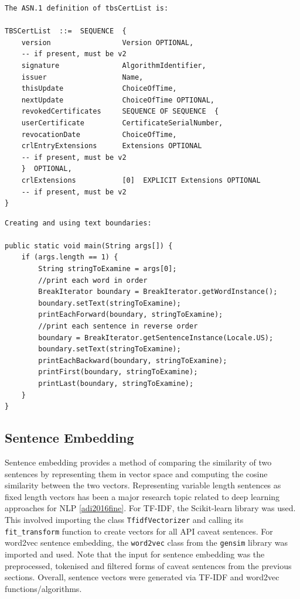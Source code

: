 \begin{lstlisting}[label=invalid-caveat-2,caption={An example of a caveat sentence extracted from the \lstinline{java.security.cert.X509CRL} documentation explaining the structure of a \lstinline{TBSCertList} object.},float,frame=tb,numbers=none,language=None,linebackgroundcolor={\lstcolorlines{3,4,5,6,7,8,9,10,11,12,13,14,15,16,17}}]
The ASN.1 definition of tbsCertList is:

TBSCertList  ::=  SEQUENCE  {
	version                 Version OPTIONAL,
	-- if present, must be v2
	signature               AlgorithmIdentifier,
	issuer                  Name,
	thisUpdate              ChoiceOfTime,
	nextUpdate              ChoiceOfTime OPTIONAL,
	revokedCertificates     SEQUENCE OF SEQUENCE  {
	userCertificate         CertificateSerialNumber,
	revocationDate          ChoiceOfTime,
	crlEntryExtensions      Extensions OPTIONAL
	-- if present, must be v2
	}  OPTIONAL,
	crlExtensions           [0]  EXPLICIT Extensions OPTIONAL
	-- if present, must be v2
}
\end{lstlisting}

\begin{lstlisting}[label=invalid-caveat-3,caption={An example of a caveat sentence extracted from the \lstinline{java.text.BreakIterator} documentation that contains some sample code.},float,frame=tb,numbers=none,language=None,linebackgroundcolor={\lstcolorlines{3,4,5,6,7,8,9,10,11,12,13,14,15,16,17}}]
Creating and using text boundaries:

public static void main(String args[]) {
	if (args.length == 1) {
		String stringToExamine = args[0];
		//print each word in order
		BreakIterator boundary = BreakIterator.getWordInstance();
		boundary.setText(stringToExamine);
		printEachForward(boundary, stringToExamine);
		//print each sentence in reverse order
		boundary = BreakIterator.getSentenceInstance(Locale.US);
		boundary.setText(stringToExamine);
		printEachBackward(boundary, stringToExamine);
		printFirst(boundary, stringToExamine);
		printLast(boundary, stringToExamine);
	}
}
\end{lstlisting}

\subsection{Sentence Embedding}
\label{subsec:info-sentence-embedding}
Sentence embedding provides a method of comparing the similarity of two sentences by representing them in vector space and computing the cosine similarity between the two vectors. Representing variable length sentences as fixed length vectors has been a major research topic related to deep learning approaches for NLP \ref{adi2016fine}.
For TF-IDF, the Scikit-learn library was used. This involved importing the class \lstinline{TfidfVectorizer} and calling its \lstinline{fit_transform} function to create vectors for all API caveat sentences. For word2vec sentence embedding, the \lstinline{word2vec} class from the \lstinline{gensim} library was imported and used. Note that the input for sentence embedding was the preprocessed, tokenised and filtered forms of caveat sentences from the previous sections. Overall, sentence vectors were generated via TF-IDF and word2vec functions/algorithms.

